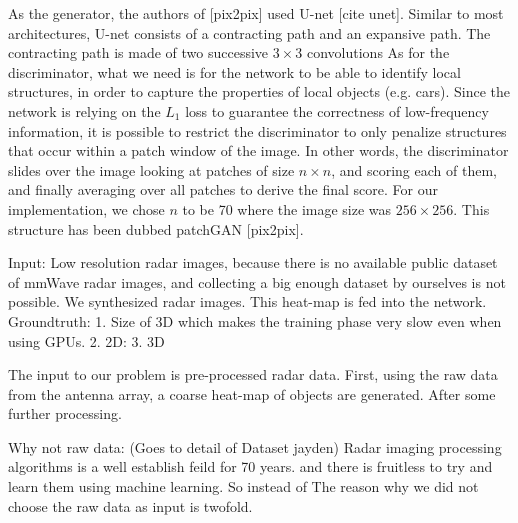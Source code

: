 As the generator, the authors of [pix2pix] used U-net [cite unet]. Similar to most architectures, U-net consists of a contracting path and an expansive path. The contracting path is made of two successive $3 \times 3$ convolutions 
As for the discriminator, what we need is for the network to be able to identify local structures, in order to capture the properties of local objects (e.g. cars). Since the network is relying on the $L_1$ loss to guarantee the correctness of low-frequency information, it is possible to restrict the discriminator to only penalize structures that occur within a patch window of the image. In other words, the discriminator slides over the image looking at patches of size $n \times n$, and scoring each of them, and finally averaging over all patches to derive the final score. For our implementation, we chose $n$ to be 70 where the image size was $256 \times 256$. This structure has been dubbed patchGAN [pix2pix].

Input: Low resolution radar images, because there is no available public dataset of mmWave radar images, and collecting a big enough dataset by ourselves is not possible. We synthesized radar images. This heat-map is fed into the network. 
	Groundtruth: 
	1. Size of 3D 	which makes the training phase very slow even when using GPUs. 
	2. 2D:
	3. 3D


The input to our problem is pre-processed radar data. First, using the raw data from the antenna array, a coarse heat-map of objects are generated. After some further processing. 

Why not raw data: (Goes to detail of Dataset jayden)
Radar imaging processing algorithms is a well establish feild for 70 years. and there is fruitless to try and learn them using machine learning.
So instead of  The reason why we did not choose the raw data as input is twofold. 